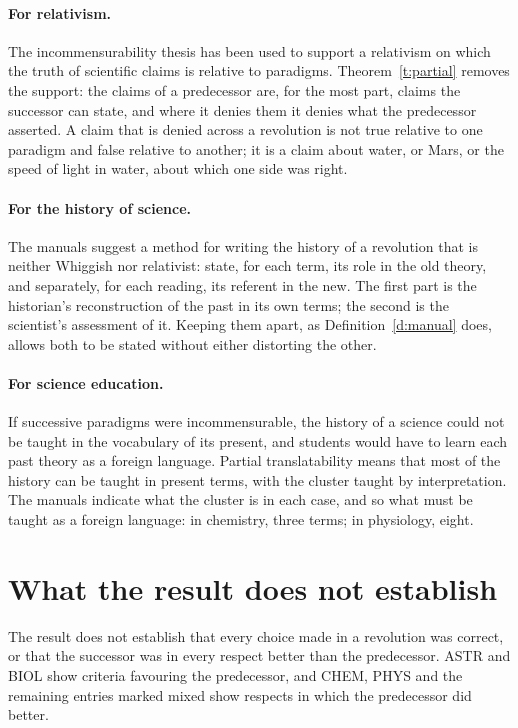 \documentclass{situationist-preprint}
\begin{document}
\paragraph{For relativism.} The incommensurability thesis has been used to support a relativism on which the truth of scientific claims is relative to paradigms. Theorem~\ref{t:partial} removes the support: the claims of a predecessor are, for the most part, claims the successor can state, and where it denies them it denies what the predecessor asserted. A claim that is denied across a revolution is not true relative to one paradigm and false relative to another; it is a claim about water, or Mars, or the speed of light in water, about which one side was right.

\paragraph{For the history of science.} The manuals suggest a method for writing the history of a revolution that is neither Whiggish nor relativist: state, for each term, its role in the old theory, and separately, for each reading, its referent in the new. The first part is the historian's reconstruction of the past in its own terms; the second is the scientist's assessment of it. Keeping them apart, as Definition~\ref{d:manual} does, allows both to be stated without either distorting the other.

\paragraph{For science education.} If successive paradigms were incommensurable, the history of a science could not be taught in the vocabulary of its present, and students would have to learn each past theory as a foreign language. Partial translatability means that most of the history can be taught in present terms, with the cluster taught by interpretation. The manuals indicate what the cluster is in each case, and so what must be taught as a foreign language: in chemistry, three terms; in physiology, eight.

\section{What the result does not establish}\label{s:not}

The result does not establish that every choice made in a revolution was correct, or that the successor was in every respect better than the predecessor. ASTR and BIOL show criteria favouring the predecessor, and CHEM, PHYS and the remaining entries marked mixed show respects in which the predecessor did better.
\end{document}
